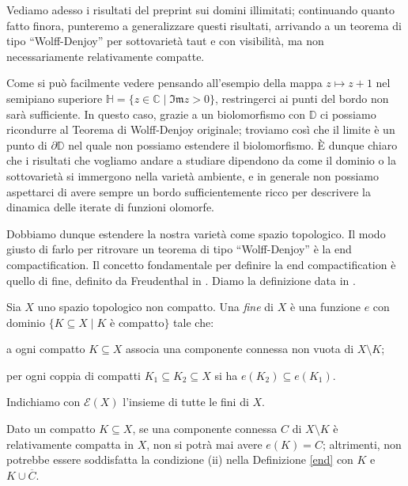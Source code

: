 Vediamo adesso i risultati del preprint \cite{BZ2} sui domini illimitati; continuando quanto fatto finora, punteremo a generalizzare questi risultati, arrivando a un teorema di tipo ``Wolff-Denjoy'' per sottovarietà taut e con visibilità, ma non necessariamente relativamente compatte.

Come si può facilmente vedere pensando all'esempio della mappa $z\longmapsto z+1$ nel semipiano superiore $\mathbb{H}=\{z\in\mathbb{C}\mid\mathfrak{Im}z>0\}$, restringerci ai punti del bordo non sarà sufficiente. In questo caso, grazie a un biolomorfismo con $\mathbb{D}$ ci possiamo ricondurre al Teorema di Wolff-Denjoy originale; troviamo così che il limite è un punto di $\partial\mathbb{D}$ nel quale non possiamo estendere il biolomorfismo. È dunque chiaro che i risultati che vogliamo andare a studiare dipendono da come il dominio o la sottovarietà si immergono nella varietà ambiente, e in generale non possiamo aspettarci di avere sempre un bordo sufficientemente ricco per descrivere la dinamica delle iterate di funzioni olomorfe.

Dobbiamo dunque estendere la nostra varietà come spazio topologico. Il modo giusto di farlo per ritrovare un teorema di tipo ``Wolff-Denjoy'' è la end compactification. Il concetto fondamentale per definire la end compactification è quello di fine, definito da Freudenthal in \cite{F}. Diamo la definizione data in \cite[Chapter 1, Problem 19]{Sp}.

\begin{defn} \label{end}
    Sia $X$ uno spazio topologico non compatto. Una \textit{fine} di $X$ è una funzione $e$ con dominio $\{K\subseteq X\mid K\text{ è compatto}\}$ tale che:
    \begin{nlist}
        \item a ogni compatto $K\subseteq X$ associa una componente connessa non vuota di $X\setminus K$;
        \item per ogni coppia di compatti $K_1\subseteq K_2\subseteq X$ si ha $e(K_2)\subseteq e(K_1)$.
    \end{nlist}
    Indichiamo con $\mathcal{E}(X)$ l'insieme di tutte le fini di $X$.
\end{defn}

\begin{oss} \label{endnonrelcpt}
    Dato un compatto $K\subseteq X$, se una componente connessa $C$ di $X\setminus K$ è relativamente compatta in $X$, non si potrà mai avere $e(K)=C$; altrimenti, non potrebbe essere soddisfatta la condizione (ii) nella Definizione \ref{end} con $K$ e $K\cup\overline{C}$.
\end{oss}

